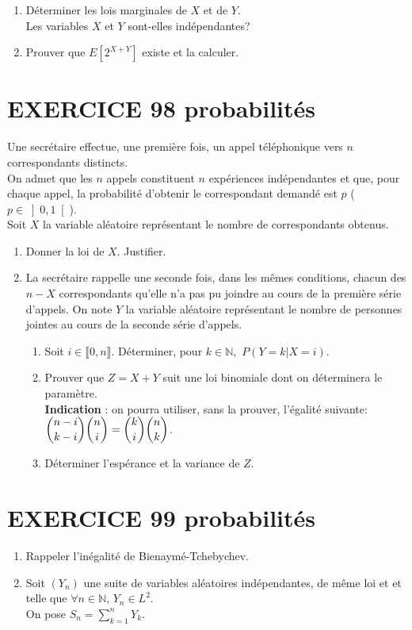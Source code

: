 \documentclass[10pt,oneside]{article}
\begin{document}
\begin{flushleft}
\begin{enumerate}
\item
Déterminer les lois marginales de $X$ et de $Y$.\\
Les variables $X$ et $Y$ sont-elles indépendantes?
\item
Prouver que $E\left[ 2^{X+Y}\right] $ existe et la calculer.
\end{enumerate}

\section*{EXERCICE 98 \:probabilités}
Une secrétaire effectue, une première fois, un appel téléphonique vers $n$ correspondants distincts.\\
On admet que les $n$ appels constituent $n$ expériences indépendantes et que, pour chaque appel, la probabilité d'obtenir le correspondant demandé est $p$ ($p\in{\left]  0,1\right[ }$).\\
Soit $X$ la variable aléatoire représentant le nombre de correspondants obtenus.
\begin{enumerate}
\item Donner la loi de $X$. Justifier.
\item
La secrétaire rappelle une seconde fois, dans les mêmes conditions, chacun des $n-X$ correspondants qu'elle n'a pas pu joindre au cours de la première série d'appels.
On note $Y$ la variable aléatoire représentant le nombre de personnes jointes au cours de la seconde série d'appels.
\begin{enumerate}
\item
Soit $i\in \llbracket 0,n \rrbracket $.
Déterminer, pour  $k\in \mathbb{N}, $ $P(Y=k|X=i)$.
\item
Prouver que $Z=X+Y$ suit une loi binomiale dont on déterminera le paramètre.\\
\textbf{Indication} : on pourra utiliser, sans la prouver, l'égalité suivante: $\dbinom{n-i}{k-i}\dbinom{n}{i}=\dbinom{k}{i}\dbinom{n}{k}$.\\
\item
Déterminer l'espérance et la variance de $Z$.
\end{enumerate}
\end{enumerate}

\section*{EXERCICE 99 \:probabilités}

\begin{enumerate}
\item
Rappeler l'inégalité de Bienaymé-Tchebychev.
\item
 Soit $(Y_n)$ une suite de variables aléatoires  indépendantes, de même loi et et telle que $\forall n\in \mathbb{N}$, $Y_n\in L^2$.\\  On pose $S_n=\displaystyle\sum\limits_{k=1}^{n}Y_k$.\\


\end{enumerate}
\end{flushleft}
\end{document}
